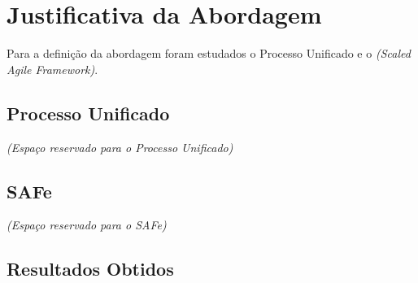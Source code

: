 \section{Justificativa da Abordagem}
	\setlength{\parindent}{10ex}
	Para a definição da abordagem foram estudados o Processo Unificado e o \textit{(Scaled Agile Framework)}.

	\subsection{Processo Unificado}
	\textit{(Espaço reservado para o Processo Unificado)}
	\subsection{SAFe}
	\textit{(Espaço reservado para o SAFe)}
	\subsection{Resultados Obtidos}

